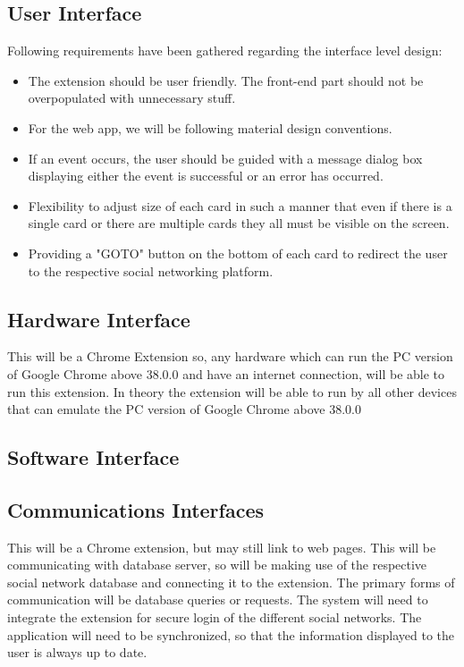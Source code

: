 \documentclass[12pt]{article}
\begin{document}
\subsection{User Interface}
Following requirements have been gathered regarding the
interface level design:

\begin{itemize}
    \item The extension should be user friendly. The front-end
part should not be overpopulated with unnecessary
stuff.
    \item For the web app, we will be following material design
conventions.
    \item If an event occurs, the user should be guided with a
message dialog box displaying either the event is successful or an error has occurred.
    \item Flexibility to adjust size of each card in such a
manner that even if there is a single card or there
are multiple cards they all must be visible on the
screen.
    \item Providing a {"}GOTO{"} button on the bottom of each card to redirect
the user to the respective social networking platform. 
\end{itemize}

\subsection{Hardware Interface}
This will be a Chrome Extension so, any hardware which
can run the PC version of Google Chrome above 38.0.0 and
have an internet connection, will be able to run this
extension. In theory the extension will be able to run by all
other devices that can emulate the PC version of Google
Chrome above 38.0.0

\subsection{Software Interface}

\subsection{ Communications Interfaces}
This will be a Chrome extension, but may still link to web
pages. This will be communicating with database server, so
will be making use of the respective social network
database and connecting it to the extension. The primary
forms of communication will be database queries or
requests. The system will need to integrate the extension
for secure login of the different social networks. The
application will need to be synchronized, so that the
information displayed to the user is always up to date.
\end{document}

